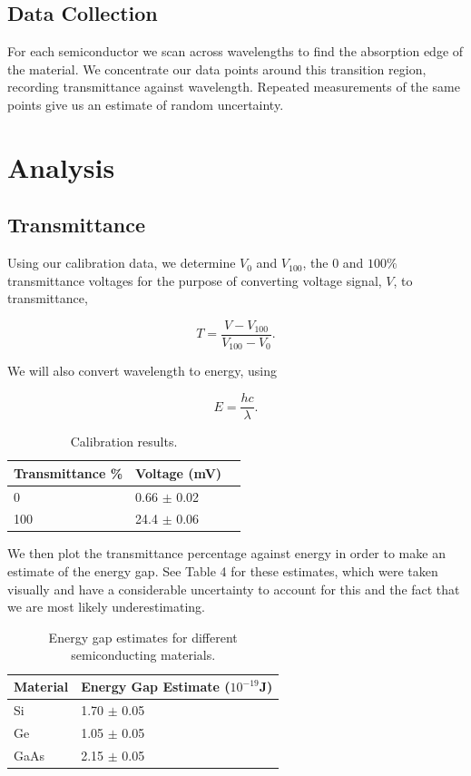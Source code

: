 \documentclass{article}
\begin{document}
\subsection{Data Collection}

For each semiconductor we scan across wavelengths to find the absorption edge of the material. We concentrate our data points around this transition region, recording transmittance against wavelength. Repeated measurements of the same points give us an estimate of random uncertainty.


\section{Analysis}
\subsection{Transmittance}

Using our calibration data, we determine $V_0$ and $V_{100}$, the 0 and $100\%$ transmittance voltages for the purpose of converting voltage signal, $V$, to transmittance,

\begin{equation}
	T = \frac{V - V_{100}}{V_{100} - V_0}.
\end{equation}

We will also convert wavelength to energy, using

\begin{equation}
	E = \frac{hc}{\lambda}.
\end{equation}

\begin{table}[]
\centering
\caption{Calibration results.}
\label{voltages}
\begin{tabular}{@{}lll@{}}
Transmittance \% & Voltage (mV) \\ \midrule
0                & 0.66 $\pm$ 0.02 \\
100              & 24.4  $\pm$ 0.06
\end{tabular}
\end{table}
 
We then plot the transmittance percentage against energy in order to make an estimate of the energy gap. See Table 4 for these estimates, which were taken visually and have a considerable uncertainty to account for this and the fact that we are most likely underestimating.

\begin{table}[]
\centering
\caption{Energy gap estimates for different semiconducting materials.}
\label{gap estimates}
\begin{tabular}{@{}ll@{}}
Material & Energy Gap Estimate ($10^{-19}$J) \\ \midrule
Si       & 1.70 $\pm$ 0.05                            \\
Ge       & 1.05 $\pm$ 0.05                          \\
GaAs     & 2.15 $\pm$ 0.05                         
\end{tabular}
\end{table}
\end{document}
